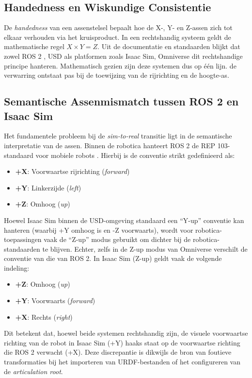 \subsection{Handedness en Wiskundige Consistentie}
De \textit{handedness} van een assenstelsel bepaalt hoe de X-, Y- en Z-assen zich tot elkaar verhouden via het kruisproduct. In een rechtshandig systeem geldt de mathematische regel $X \times Y = Z$. Uit de documentatie en standaarden blijkt dat zowel ROS 2 \autocite{Foote2010}, USD \autocite{Studios2026} als platformen zoals Isaac Sim, Omniverse dit rechtshandige principe hanteren. Mathematisch gezien zijn deze systemen dus op één lijn. de verwarring ontstaat pas bij de toewijzing van de rijrichting en de hoogte-as.

\subsection{Semantische Assenmismatch tussen ROS 2 en Isaac Sim}
Het fundamentele probleem bij de \textit{sim-to-real} transitie ligt in de semantische interpretatie van de assen. Binnen de robotica hanteert ROS 2 de REP 103-standaard voor mobiele robots \autocite{Foote2010}. Hierbij is de conventie strikt gedefinieerd als:
\begin{itemize}
\item \textbf{+X}: Voorwaartse rijrichting (\textit{forward})
\item \textbf{+Y}: Linkerzijde (\textit{left})
\item \textbf{+Z}: Omhoog (\textit{up})
\end{itemize}

Hoewel Isaac Sim binnen de USD-omgeving standaard een ``Y-up'' conventie kan hanteren (waarbij +Y omhoog is en -Z voorwaarts), wordt voor robotica-toepassingen vaak de ``Z-up'' modus gebruikt om dichter bij de robotica-standaarden te blijven. Echter, zelfs in de Z-up modus van Omniverse verschilt de conventie van die van ROS 2. In Isaac Sim (Z-up) geldt vaak de volgende indeling:
\begin{itemize}
\item \textbf{+Z}: Omhoog (\textit{up})
\item \textbf{+Y}: Voorwaarts (\textit{forward})
\item \textbf{+X}: Rechts (\textit{right})
\end{itemize}
Dit betekent dat, hoewel beide systemen rechtshandig zijn, de visuele voorwaartse richting van de robot in Isaac Sim (+Y) haaks staat op de voorwaartse richting die ROS 2 verwacht (+X). Deze discrepantie is dikwijls de bron van foutieve transformaties bij het importeren van URDF-bestanden of het configureren van de \textit{articulation root}.

